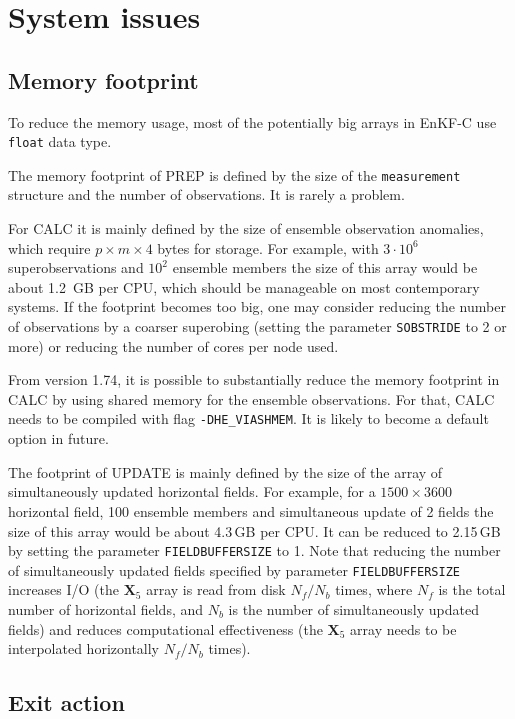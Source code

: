 \documentclass[11pt]{report}
\newcommand{\mb} {\mathbf}
\begin{document}
\section{System issues}

\subsection{Memory footprint}

To reduce the memory usage, most of the potentially big arrays in EnKF-C use \verb|float| data type.

The memory footprint of PREP is defined by the size of the \verb|measurement| structure and the number of observations.
It is rarely a problem.

For CALC it is mainly defined by the size of ensemble observation anomalies, which require $p \times m \times 4$ bytes for storage.
For example, with $3 \cdot 10^6$ superobservations and $10^2$ ensemble members the size of this array would be about 1.2\, GB per CPU, which should be manageable on most contemporary systems.
If the footprint becomes too big, one may consider reducing the number of observations by a coarser superobing (setting the parameter \verb|SOBSTRIDE| to 2 or more) or reducing the number of cores per node used.

From version 1.74, it is possible to substantially reduce the memory footprint in CALC by using shared memory for the ensemble observations.
For that, CALC needs to be compiled with flag \verb|-DHE_VIASHMEM|.
It is likely to become a default option in future.

The footprint of UPDATE is mainly defined by the size of the array of simultaneously updated horizontal fields.
For example, for a $1500 \times 3600$ horizontal field, 100 ensemble members and simultaneous update of 2 fields the size of this array would be about 4.3\,GB per CPU.
It can be reduced to 2.15\,GB by setting the parameter \verb|FIELDBUFFERSIZE| to 1.
Note that reducing the number of simultaneously updated fields specified by parameter \verb|FIELDBUFFERSIZE| increases I/O (the $\mb X_5$ array is read from disk $N_f / N_b$ times, where $N_f$ is the total number of horizontal fields, and $N_b$ is the number of simultaneously updated fields) and reduces computational effectiveness (the $\mb X_5$ array needs to be interpolated horizontally $N_f / N_b$ times).

\subsection{Exit action}
\end{document}
